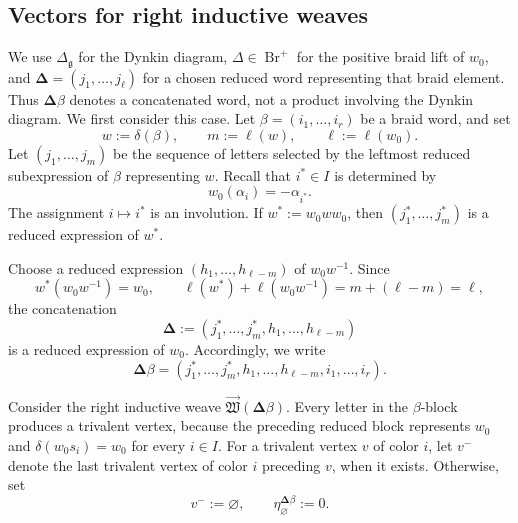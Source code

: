 \documentclass[12pt, reqno]{amsart}
\theoremstyle{plain}
\theoremstyle{definition}
\numberwithin{equation}{section}
\newcommand{\fg}{\operatorname{\mathfrak{g}}}
\newcommand{\Br}{{\operatorname{Br}}}
\begin{document}
\subsection{Vectors for right inductive weaves}
We use \(\Delta_{\fg}\) for the Dynkin diagram,
\(\Delta\in\Br^+\) for the positive braid lift of \(w_0\), and
\(\boldsymbol\Delta=(j_1,\ldots,j_\ell)\) for a chosen reduced word
representing that braid element. Thus
\(\boldsymbol\Delta\beta\) denotes a concatenated word, not a
product involving the Dynkin diagram. We first consider this case.
Let \(\beta=(i_1,\ldots,i_r)\) be a braid word, and set
\begin{equation}\label{eq:w-delta-beta}
    w:=\delta(\beta),
    \qquad
    m:=\ell(w),
    \qquad
    \ell:=\ell(w_0).
\end{equation}
Let \((j_1,\ldots,j_m)\) be the sequence of letters selected by the
leftmost reduced subexpression of \(\beta\) representing \(w\).
Recall that \(i^*\in I\) is determined by
\begin{equation}\label{eq:star-involution-simple-roots}
    w_0(\alpha_i)=-\alpha_{i^*}.
\end{equation}
The assignment \(i\mapsto i^*\) is an involution. If
\(w^*:=w_0ww_0\), then \((j_1^*,\ldots,j_m^*)\) is a reduced
expression of \(w^*\).

Choose a reduced expression
\((h_1,\ldots,h_{\ell-m})\) of \(w_0w^{-1}\). Since
\begin{equation}\label{eq:completion-to-w0}
    w^*(w_0w^{-1})=w_0,
    \qquad
    \ell(w^*)+\ell(w_0w^{-1})
    =m+(\ell-m)=\ell,
\end{equation}
the concatenation
\begin{equation}\label{eq:adapted-reduced-expression-Delta}
    \boldsymbol{\Delta}
    :=(j_1^*,\ldots,j_m^*,h_1,\ldots,h_{\ell-m})
\end{equation}
is a reduced expression of \(w_0\). Accordingly, we write
\begin{equation}\label{eq:word-Delta-beta}
    \boldsymbol{\Delta}\beta
    =(j_1^*,\ldots,j_m^*,h_1,\ldots,h_{\ell-m},
      i_1,\ldots,i_r).
\end{equation}

Consider the right inductive weave
\(\overrightarrow{\mathfrak W}(\boldsymbol{\Delta}\beta)\).
Every letter in the \(\beta\)-block produces a trivalent vertex,
because the preceding reduced block represents \(w_0\) and
\(\delta(w_0s_i)=w_0\) for every \(i\in I\). For a trivalent
vertex \(v\) of color \(i\), let \(v^-\) denote the last trivalent
vertex of color \(i\) preceding \(v\), when it exists. Otherwise,
set
\begin{equation}\label{eq:empty-predecessor-convention}
    v^-:=\varnothing,
    \qquad
    \eta_{\varnothing}^{\boldsymbol{\Delta}\beta}:=0.
\end{equation}
\end{document}
